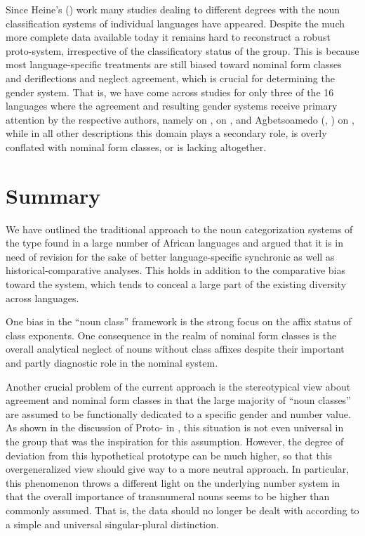 \documentclass[output=collectionpaper]{langsci/langscibook}
\begin{document}
Since Heine's (\citeyear{Heine1968}) work many studies dealing to different degrees with the noun classification systems of individual  languages have appeared. Despite the much more complete data available today it remains hard to reconstruct a robust proto-system, irrespective of the classificatory status of the group. This is because most language-specific treatments are still biased toward nominal form classes and deriflections and neglect agreement, which is crucial for determining the gender system. That is, we have come across studies for only three of the 16 languages where the agreement and resulting gender systems receive primary attention by the respective authors, namely \citet{Zaske2007} on , \citet{Essegbey2009} on , and Agbetsoamedo (\citeyear{Agbetsoamedo2014a}, \citeyear{Agbetsoamedo2014}) on , while in all other descriptions this domain plays a secondary role, is overly conflated with nominal form classes, or is lacking altogether.

\section{Summary}
\label{sec:Gueld:4}


We have outlined the traditional approach to the noun categorization systems of the  type found in a large number of African languages and argued that it is in need of revision for the sake of better language-specific synchronic as well as historical-comparative analyses. This holds in addition to the comparative bias toward the  system, which tends to conceal a large part of the existing diversity across  languages.

One bias in the ``noun class'' framework is the strong focus on the affix status of class exponents. One consequence in the realm of nominal form classes is the overall analytical neglect of nouns without class affixes despite their important and partly diagnostic role in the nominal system.

Another crucial problem of the current  approach is the stereotypical view about agreement and nominal form classes in that the large majority of ``noun classes'' are assumed to be functionally dedicated to a specific gender and number value. As shown in the discussion of Proto- in , this situation is not even universal in the group that was the inspiration for this assumption. However, the degree of deviation from this hypothetical prototype can be much higher, so that this overgeneralized view should give way to a more neutral approach. In particular, this phenomenon throws a different light on the underlying number system in that the overall importance of transnumeral nouns seems to be higher than commonly assumed. That is, the data should no longer be dealt with according to a simple and universal singular-plural distinction.
\end{document}
